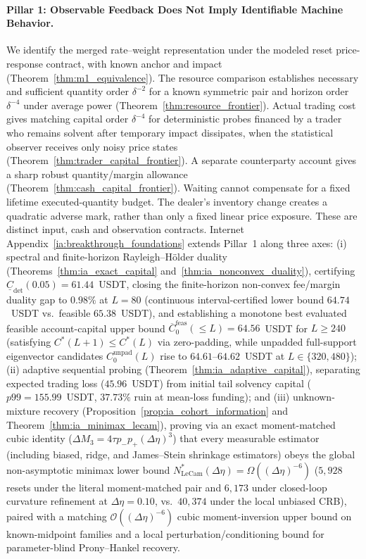 \documentclass[12pt]{article}
\theoremstyle{definition}
\theoremstyle{remark}
\begin{document}
\paragraph{Pillar 1: Observable Feedback Does Not Imply Identifiable Machine Behavior.}
We identify the merged rate--weight representation under the modeled reset price-response contract, with known anchor and impact (Theorem~\ref{thm:m1_equivalence}). The resource comparison establishes necessary and sufficient quantity order $\delta^{-2}$ for a known symmetric pair and horizon order $\delta^{-4}$ under average power (Theorem~\ref{thm:resource_frontier}). Actual trading cost gives matching capital order $\delta^{-4}$ for deterministic probes financed by a trader who remains solvent after temporary impact dissipates, when the statistical observer receives only noisy price states (Theorem~\ref{thm:trader_capital_frontier}). A separate counterparty account gives a sharp robust quantity/margin allowance (Theorem~\ref{thm:cash_capital_frontier}). Waiting cannot compensate for a fixed lifetime executed-quantity budget. The dealer's inventory change creates a quadratic adverse mark, rather than only a fixed linear price exposure. These are distinct input, cash and observation contracts. Internet Appendix~\ref{ia:breakthrough_foundations} extends Pillar~1 along three axes: (i) spectral and finite-horizon Rayleigh--H\"older duality (Theorems~\ref{thm:ia_exact_capital} and~\ref{thm:ia_nonconvex_duality}), certifying $\underline{C}_{\mathrm{det}}(0.05) = 61.44$~USDT, closing the finite-horizon non-convex fee/margin duality gap to $0.98\%$ at $L=80$ (continuous interval-certified lower bound $64.74$~USDT vs.\ feasible $65.38$~USDT), and establishing a monotone best evaluated feasible account-capital upper bound $\overline{C}_0^{\mathrm{feas}}(\le L) = 64.56$~USDT for $L \ge 240$ (satisfying $C^*(L+1) \le C^*(L)$ via zero-padding, while unpadded full-support eigenvector candidates $C_0^{\mathrm{unpad}}(L)$ rise to $64.61$--$64.62$~USDT at $L \in \{320, 480\}$); (ii) adaptive sequential probing (Theorem~\ref{thm:ia_adaptive_capital}), separating expected trading loss ($45.96$~USDT) from initial tail solvency capital ($p99 = 155.99$~USDT, $37.73\%$ ruin at mean-loss funding); and (iii) unknown-mixture recovery (Proposition~\ref{prop:ia_cohort_information} and Theorem~\ref{thm:ia_minimax_lecam}), proving via an exact moment-matched cubic identity ($\Delta M_3 = 4\tau p_- p_+ (\Delta\eta)^3$) that every measurable estimator (including biased, ridge, and James--Stein shrinkage estimators) obeys the global non-asymptotic minimax lower bound $N^*_{\mathrm{LeCam}}(\Delta\eta) = \Omega((\Delta\eta)^{-6})$ ($5{,}928$ resets under the literal moment-matched pair and $6{,}173$ under closed-loop curvature refinement at $\Delta\eta=0.10$, vs.\ $40{,}374$ under the local unbiased CRB), paired with a matching $\mathcal{O}((\Delta\eta)^{-6})$ cubic moment-inversion upper bound on known-midpoint families and a local perturbation/conditioning bound for parameter-blind Prony--Hankel recovery.
\end{document}
